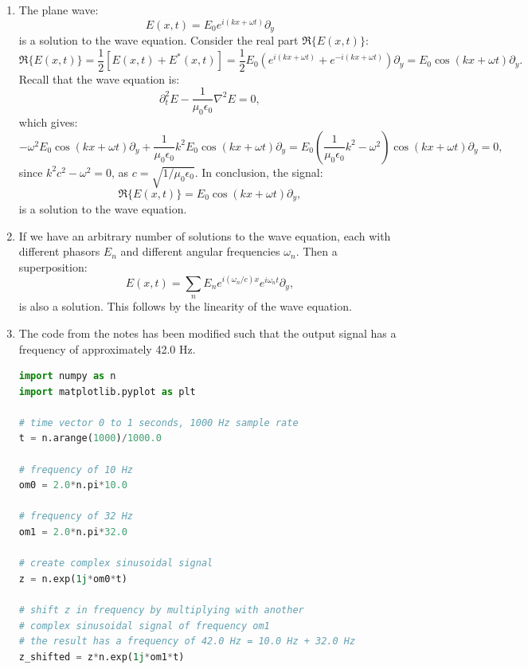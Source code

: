 \begin{enumerate}
\item The plane wave:
$$E(x,t)=E_{0}e^{i(kx+\omega t)}\partial_{y}$$
is a solution to the wave equation. Consider the real part $\Re\{E(x,t)\}$:
$$\Re\{E(x,t)\}=\frac{1}{2}[E(x,t)+E^{*}(x,t)]=\frac{1}{2}E_{0}(e^{i(kx+\omega t)}+e^{-i(kx+\omega t)})\partial_{y}=E_{0}\cos(kx+\omega t)\partial_{y}.$$
Recall that the wave equation is:
$$\partial_{t}^{2}E-\frac{1}{\mu_{0}\epsilon_{0}}\nabla^{2}E=0,$$
which gives:
$$-\omega^{2}E_{0}\cos(kx+\omega t)\partial_{y}+\frac{1}{\mu_{0}\epsilon_{0}}k^{2}E_{0}\cos(kx+\omega t)\partial_{y}=E_{0}\left(\frac{1}{\mu_{0}\epsilon_{0}}k^{2}-\omega^{2}\right)\cos(kx+\omega t)\partial_{y}=0,$$
since $k^{2}c^{2}-\omega^{2}=0$, as $c=\sqrt{1/\mu_0\epsilon_0}$. In conclusion, the signal:
$$\Re\{E(x,t)\}=E_{0}\cos(kx+\omega t)\partial_{y},$$
is a solution to the wave equation. 

\item If we have an arbitrary number of solutions to the wave equation, each with different 
phasors $E_{n}$ and different angular frequencies $\omega_{n}$. Then a superposition:
$$E(x,t)=\sum_{n}E_{n}e^{i(\omega_{n}/c)x}e^{i\omega_{n}t}\partial_{y},$$
is also a solution. This follows by the linearity of the wave equation. 

\item The code from the notes has been modified such that the output signal has a frequency of approximately 42.0 Hz. 
\begin{lstlisting}[language=Python, caption=Adding frequencies,label=sig42]
import numpy as n
import matplotlib.pyplot as plt

# time vector 0 to 1 seconds, 1000 Hz sample rate
t = n.arange(1000)/1000.0

# frequency of 10 Hz
om0 = 2.0*n.pi*10.0

# frequency of 32 Hz
om1 = 2.0*n.pi*32.0

# create complex sinusoidal signal
z = n.exp(1j*om0*t)

# shift z in frequency by multiplying with another 
# complex sinusoidal signal of frequency om1
# the result has a frequency of 42.0 Hz = 10.0 Hz + 32.0 Hz
z_shifted = z*n.exp(1j*om1*t)


\end{lstlisting}
\end{enumerate}
